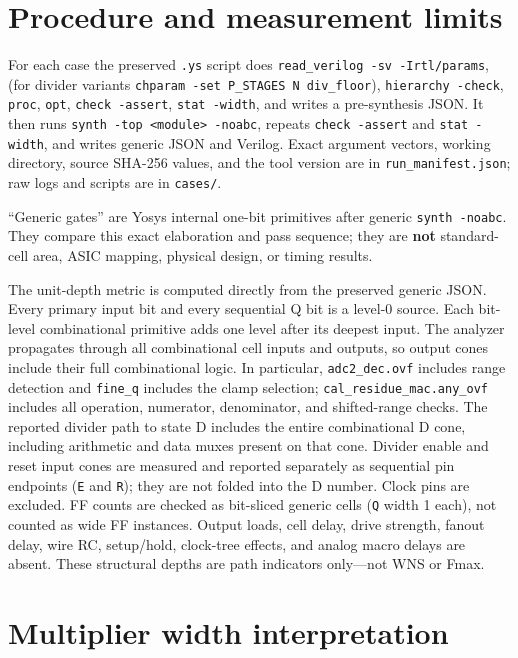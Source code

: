 \documentclass[UTF8,fontset=fandol,10pt,a4paper,openany]{ctexrep}
\newcommand{\code}[1]{\nolinkurl{#1}}
\begin{document}
\section{Procedure and measurement limits}


For each case the preserved \code{.ys} script does \code{read_verilog -sv -Irtl/params}, (for divider variants \code{chparam -set P_STAGES N div_floor}), \code{hierarchy -check}, \code{proc}, \code{opt}, \code{check -assert}, \code{stat -width}, and writes a pre-synthesis JSON. It then runs \code{synth -top <module> -noabc}, repeats \code{check -assert} and \code{stat -width}, and writes generic JSON and Verilog. Exact argument vectors, working directory, source SHA-256 values, and the tool version are in \code{run_manifest.json}; raw logs and scripts are in \code{cases/}.


“Generic gates” are Yosys internal one-bit primitives after generic \code{synth -noabc}. They compare this exact elaboration and pass sequence; they are \textbf{not} standard-cell area, ASIC mapping, physical design, or timing results.


The unit-depth metric is computed directly from the preserved generic JSON. Every primary input bit and every sequential Q bit is a level-0 source. Each bit-level combinational primitive adds one level after its deepest input. The analyzer propagates through all combinational cell inputs and outputs, so output cones include their full combinational logic. In particular, \code{adc2_dec.ovf} includes range detection and \code{fine_q} includes the clamp selection; \code{cal_residue_mac.any_ovf} includes all operation, numerator, denominator, and shifted-range checks. The reported divider path to state D includes the entire combinational D cone, including arithmetic and data muxes present on that cone. Divider enable and reset input cones are measured and reported separately as sequential pin endpoints (\code{E} and \code{R}); they are not folded into the D number. Clock pins are excluded. FF counts are checked as bit-sliced generic cells (\code{Q} width 1 each), not counted as wide FF instances. Output loads, cell delay, drive strength, fanout delay, wire RC, setup/hold, clock-tree effects, and analog macro delays are absent. These structural depths are path indicators only—not WNS or Fmax.


\section{Multiplier width interpretation}
\end{document}

